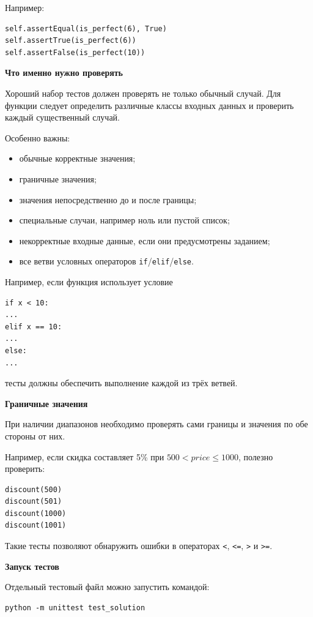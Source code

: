 Например:

\begin{verbatim}
self.assertEqual(is_perfect(6), True)
self.assertTrue(is_perfect(6))
self.assertFalse(is_perfect(10))
\end{verbatim}

\textbf{Что именно нужно проверять}

Хороший набор тестов должен проверять не только обычный случай. Для функции
следует определить различные классы входных данных и проверить каждый
существенный случай.

Особенно важны:

\begin{itemize}
\item обычные корректные значения;
\item граничные значения;
\item значения непосредственно до и после границы;
\item специальные случаи, например ноль или пустой список;
\item некорректные входные данные, если они предусмотрены заданием;
\item все ветви условных операторов \texttt{if}/\texttt{elif}/\texttt{else}.
\end{itemize}

Например, если функция использует условие

\begin{verbatim}
if x < 10:
...
elif x == 10:
...
else:
...
\end{verbatim}

тесты должны обеспечить выполнение каждой из трёх ветвей.

\textbf{Граничные значения}

При наличии диапазонов необходимо проверять сами границы и значения по обе
стороны от них.

Например, если скидка составляет 5\% при
$500 < price \leqslant 1000$, полезно проверить:

\begin{verbatim}
discount(500)
discount(501)
discount(1000)
discount(1001)
\end{verbatim}

Такие тесты позволяют обнаружить ошибки в операторах
\texttt{<}, \texttt{<=}, \texttt{>} и \texttt{>=}.

\textbf{Запуск тестов}

Отдельный тестовый файл можно запустить командой:

\begin{verbatim}
python -m unittest test_solution
\end{verbatim}


